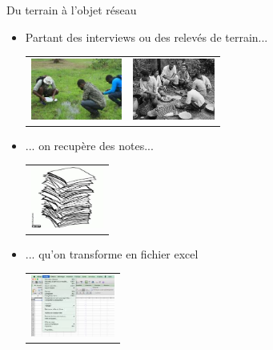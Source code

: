 \documentclass[compress,10pt]{beamer}
\begin{document}
\begin{frame}{Du terrain à l'objet réseau}

\begin{itemize}
\item  Partant des interviews  ou des relevés de terrain... 

\begin{tabular}{cc}
  \includegraphics[width = 0.3 \textwidth, height=2cm]{plots/eco_1.jpg} &
 \includegraphics[width = 0.3 \textwidth, height=2cm]{plots/ethno_2.jpg}
\end{tabular}
\item ... on recupère des notes... 
\begin{tabular}{c}
 \includegraphics[width = 0.3 \textwidth, height=2cm]{plots/tas_notes.jpg} 
\end{tabular}
\item ... qu'on transforme en fichier excel

\begin{tabular}{c}
 \includegraphics[width = 0.3 \textwidth, height=2cm]{plots/excel.jpg} 
\end{tabular}
\end{itemize}


\end{frame}
\end{document}
